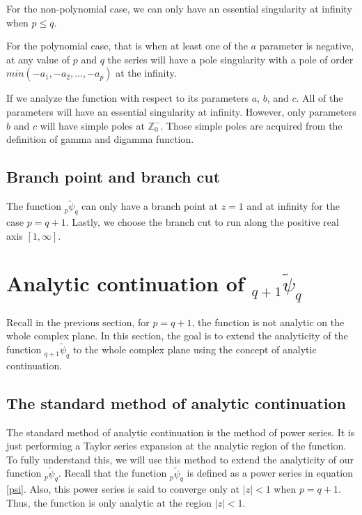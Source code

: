 For the non-polynomial case, we can only have an essential singularity at infinity when $p \leq q$. 

For the polynomial case, that is when at least one of the $a$ parameter is negative, at any value of $p$ and $q$ the series will have a pole singularity with a pole of order $min(-a_1, -a_2, \dots, -a_p )$ at the infinity. 

If we analyze the function with respect to its parameters $a$, $b$, and $c$. All of the parameters will have an essential singularity at infinity. However, only parameters $b$ and $c$ will have simple poles at $\mathbb{Z}_{0}^{-}$. Those simple poles are acquired from the definition of gamma and digamma function.

\subsection{Branch point and branch cut}

The function ${}_{p}\tilde{\psi}_{q}$ can only have a branch point at $z = 1$ and at infinity for the case $p = q+1$. Lastly, we choose the branch cut to run along the positive real axis $[1, \infty]$.

\section{Analytic continuation of $_{q+1}\tilde{\psi}_{q}$}

Recall in the previous section, for $p = q + 1$, the function is not analytic on the whole complex plane. In this section, the goal is to extend the analyticity of the function $_{q+1}\tilde{\psi}_{q}$  to the whole complex plane using the concept of analytic continuation.  


\subsection{The standard method of analytic continuation}

The standard method of analytic continuation is the method of power series.  It is just performing a Taylor series expansion at the analytic region of the function. To fully understand this, we will use this method to extend the analyticity of our function ${}_{p}\tilde{\psi}_{q}$. Recall that the function ${}_{p}\tilde{\psi}_{q}$ is defined as a power series in equation \eqref{psi}. Also, this power series is said to converge only at $|z| < 1$ when $p = q+1$. Thus, the function is only analytic at the region $|z| < 1$. 

